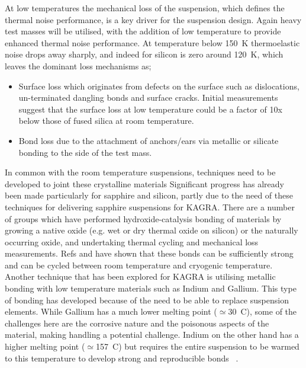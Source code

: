 At low temperatures the mechanical loss of the suspension, which defines the thermal noise performance, is a key driver for the suspension design. Again heavy test masses will be utilised, with the addition of low temperature to provide enhanced thermal noise performance. At temperature below 150~K thermoelastic noise drops away sharply, and indeed for silicon is zero around 120~K, which leaves the dominant loss mechanisms as;
\begin{itemize}
\item Surface loss \cite{Nawrodt:2013} which originates from defects on the surface such as dislocations, un-terminated dangling bonds and surface cracks. Initial measurements suggest that the surface loss at low temperature could be a factor of 10x below those of fused silica at room temperature.
\item Bond loss due to the attachment of anchors/ears via metallic or silicate bonding to the side of the test mass.
\end{itemize}
In common with the room temperature suspensions, techniques need to be developed to joint these crystalline materials Significant progress has already been made particularly for sapphire and silicon, partly due to the need of these techniques for delivering sapphire suspensions for KAGRA. There are a number of groups which have performed hydroxide-catalysis bonding of materials by growing a native oxide (e.g. wet or dry thermal oxide on silicon) or the naturally occurring oxide, and undertaking thermal cycling and mechanical loss measurements. Refs \cite{Phelps:2018b} and \cite{Haughian:2016} have shown that these bonds can be sufficiently strong and can be cycled between room temperature and cryogenic temperature. Another technique that has been explored for KAGRA is utilising metallic bonding with low temperature materials such as Indium and Gallium. This type of bonding has developed because of the need to be able to replace suspension elements. While Gallium has a much lower melting point ($\simeq$30~C), some of the challenges here are the corrosive nature and the poisonous aspects of the material, making handling a potential challenge. Indium on the other hand has a higher melting point  ($\simeq$157~C) but requires the entire suspension to be warmed to this temperature to develop strong and reproducible bonds \cite{Hofmann:2015}~\cite{Phelps:2018}. 

